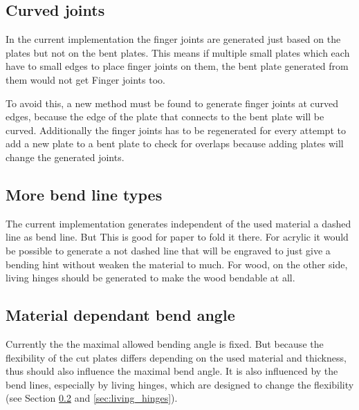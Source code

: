 \documentclass[../ClassicThesis.tex]{subfiles}
\begin{document}

\subsection{Curved joints}

In the current implementation the finger joints are generated just based on the plates but not on the bent plates. This means if multiple small plates which each have to small edges to place finger joints on them, the bent plate generated from them would not get Finger joints too.

To avoid this, a new method must be found to generate finger joints at curved edges, because the edge of the plate that connects to the bent plate  will be curved. Additionally the finger joints has to be regenerated for every attempt to add a new plate to a bent plate to check for overlaps because adding plates will change the generated joints.

\subsection{More bend line types}
\label{sec:more_bend_line_types}

The current implementation generates independent of the used material a dashed line as bend line. But This is good for paper to fold it there. For acrylic it would be possible to generate a not dashed line that will be engraved to just give a bending hint without weaken the material to much. For wood, on the other side, living hinges should be generated to make the wood bendable at all.

\subsection{Material dependant bend angle}
\label{sec:material_dependant_bend_angle}

Currently the the maximal allowed bending angle is fixed. But because the flexibility of the cut plates differs depending on the used material and thickness, thus should also influence the maximal bend angle. It is also influenced by the bend lines, especially by living hinges, which are designed to change the flexibility (see Section \ref{sec:more_bend_line_types} and \ref{sec:living_hinges}).
\end{document}
